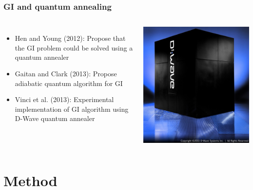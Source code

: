 \documentclass{beamer}
\begin{document}
\begin{frame}
  \frametitle{GI and quantum annealing}
    \begin{columns}
      \begin{itemize}
        \item Hen and Young (2012):
          Propose that the GI problem could be solved using a
          quantum annealer
        \item Gaitan and Clark (2013):
          Propose adiabatic quantum algorithm for GI
        \item Vinci et al. (2013):
          Experimental implementation of GI algorithm using D-Wave quantum
          annealer
      \end{itemize}
      \includegraphics[width=\textwidth]{d_wave_one_system}
    \end{columns}
\end{frame}


\section{Method}
\end{document}
